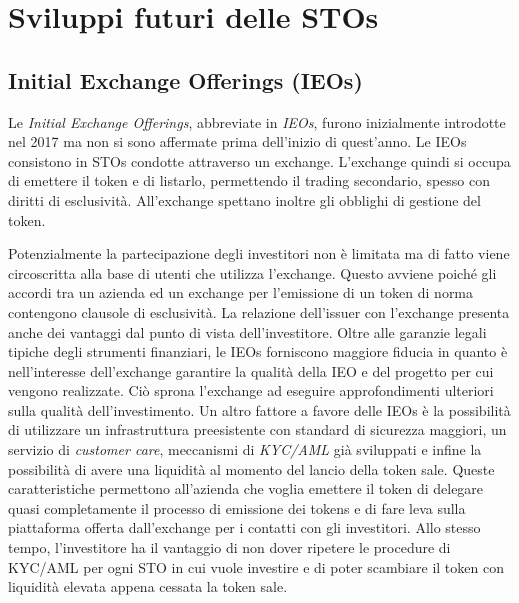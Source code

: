 \chapter{Sviluppi futuri delle STOs}
\section{Initial Exchange Offerings (IEOs)}
Le \textit{Initial Exchange Offerings}, abbreviate in \textit{IEOs}, furono inizialmente introdotte nel 2017 ma non si sono affermate prima dell'inizio di quest'anno. Le IEOs consistono in STOs condotte attraverso un exchange. L'exchange quindi si occupa di emettere il token e di listarlo, permettendo il trading secondario, spesso con diritti di esclusività. All'exchange spettano inoltre gli obblighi di gestione del token. 

Potenzialmente la partecipazione degli investitori non è limitata ma di fatto viene circoscritta alla base di utenti che utilizza l'exchange. Questo avviene poiché gli accordi tra un azienda ed un exchange per l'emissione di un token di norma contengono clausole di esclusività. 
La relazione dell'issuer con l'exchange presenta anche dei vantaggi dal punto di vista dell'investitore. Oltre alle garanzie legali tipiche degli strumenti finanziari, le IEOs forniscono maggiore fiducia in quanto è nell'interesse dell'exchange garantire la qualità della IEO e del progetto per cui vengono realizzate. Ciò sprona l'exchange ad eseguire approfondimenti ulteriori sulla qualità dell'investimento. Un altro fattore a favore delle IEOs è la possibilità di utilizzare un infrastruttura preesistente con standard di sicurezza maggiori, un servizio di \textit{customer care}, meccanismi di \textit{KYC/AML} già sviluppati e infine la possibilità di avere una liquidità al momento del lancio della token sale. 
Queste caratteristiche permettono all'azienda che voglia emettere il token di delegare quasi completamente il processo di emissione dei tokens e di fare leva sulla piattaforma offerta dall'exchange per i contatti con gli investitori. Allo stesso tempo, l'investitore ha il vantaggio di non dover ripetere le procedure di KYC/AML per ogni STO in cui vuole investire e di poter scambiare il token con liquidità elevata appena cessata la token sale.

